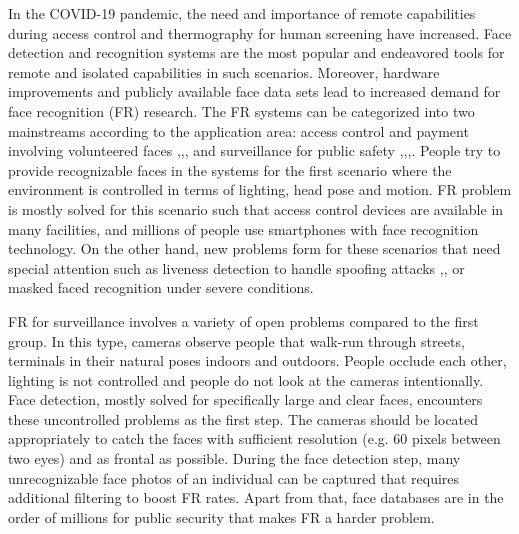 \documentclass[runningheads]{llncs}
\begin{document}
In the COVID-19 pandemic, the need and importance of remote capabilities during access control and thermography for human screening have increased. Face detection and recognition systems are the most popular and endeavored tools for remote and isolated capabilities in such scenarios. Moreover, hardware improvements and publicly available face data sets lead to increased demand for face recognition (FR) research. The FR systems can be categorized into two mainstreams according to the application area: access control and payment involving volunteered faces \cite{KonenZnFace},\cite{Yugashini2013},\cite{Ibrahim2011},\cite{Feng2017} and surveillance for public safety \cite{Wheeler2010},\cite{Lei2009},\cite{Xu2014},\cite{Haghighat2017}. People try to provide recognizable faces in the systems for the first scenario where the environment is controlled in terms of lighting, head pose and motion. FR problem is mostly solved for this scenario such that access control devices are available in many facilities, and millions of people use smartphones with face recognition technology. On the other hand, new problems form for these scenarios that need special attention such as liveness detection to handle spoofing attacks \cite{Chingovska2016},\cite{Erdogmus2014},\cite{Akbulut2017} or masked faced recognition under severe conditions. 

FR for surveillance involves a variety of open problems compared to the first group. In this type, cameras observe people that walk-run through streets, terminals in their natural poses indoors and outdoors. People occlude each other, lighting is not controlled and people do not look at the cameras intentionally. Face detection, mostly solved for specifically large and clear faces, encounters these uncontrolled problems as the first step. The cameras should be located appropriately to catch the faces with sufficient resolution (e.g. 60 pixels between two eyes) and as frontal as possible. During the face detection step, many unrecognizable face photos of an individual can be captured that requires additional filtering to boost FR rates. Apart from that, face databases are in the order of millions for public security that makes FR a harder problem.
\end{document}
